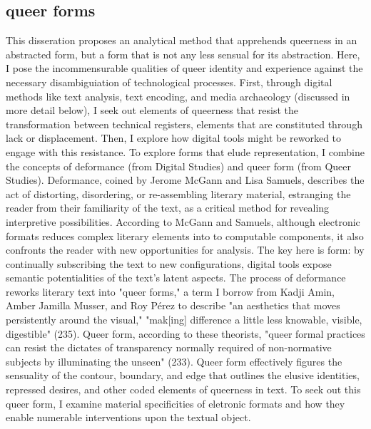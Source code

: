 \documentclass[11pt]{article}
\begin{document}
\subsection{queer forms}
\label{sec:org532c65d}
This disseration proposes an analytical method that apprehends
queerness in an abstracted form, but a form that is not any less
sensual for its abstraction. Here, I pose the incommensurable
qualities of queer identity and experience against the necessary
disambiguiation of technological processes. First, through digital
methods like text analysis, text encoding, and media archaeology
(discussed in more detail below), I seek out elements of queerness
that resist the transformation between technical registers, elements
that are constituted through lack or displacement. Then, I explore how
digital tools might be reworked to engage with this resistance. To
explore forms that elude representation, I combine the concepts of
deformance (from Digital Studies) and queer form (from Queer
Studies). Deformance, coined by Jerome McGann and Lisa Samuels,
describes the act of distorting, disordering, or re-assembling
literary material, estranging the reader from their familiarity of the
text, as a critical method for revealing interpretive
possibilities. According to McGann and Samuels, although electronic
formats reduces complex literary elements into to computable
components, it also confronts the reader with new opportunities for
analysis. The key here is form: by continually subscribing the text to
new configurations, digital tools expose semantic potentialities of
the text's latent aspects. The process of deformance reworks literary
text into "queer forms," a term I borrow from Kadji Amin, Amber
Jamilla Musser, and Roy Pérez to describe "an aesthetics that moves
persistently around the visual," "mak[ing] difference a little less
knowable, visible, digestible" (235). Queer form, according to these
theorists, "queer formal practices can resist the dictates of
transparency normally required of non-normative subjects by
illuminating the unseen" (233). Queer form effectively figures the
sensuality of the contour, boundary, and edge that outlines the
elusive identities, repressed desires, and other coded elements of
queerness in text. To seek out this queer form, I examine material
specificities of eletronic formats and how they enable numerable
interventions upon the textual object.
\end{document}
